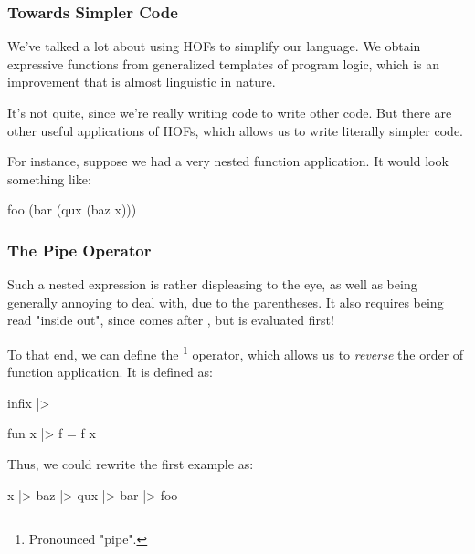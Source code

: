 \documentclass[aspectratio=169]{beamer}
\begin{document}

\begin{frame}[fragile]
  \frametitle{Towards Simpler Code}

  We've talked a lot about using HOFs to simplify our language. We obtain expressive
  functions from generalized templates of program logic, which is an improvement that
  is almost linguistic in nature.

  \pause
  \vspace{\fill}

  It's not quite, since we're really writing code to write other code. But there are
  other useful applications of HOFs, which allows us to write literally simpler code.

  \pause
  \vspace{\fill}

  For instance, suppose we had a very nested function application. It would look
  something like:

  \begin{codeblock}
    foo (bar (qux (baz x)))
  \end{codeblock}
\end{frame}

\begin{frame}[fragile]
  \frametitle{The Pipe Operator}

  Such a nested expression is rather displeasing to the eye, as well as being
  generally annoying to deal with, due to the parentheses. It also requires being
  read "inside out", since  comes after , but is evaluated first!

  \pause
  \vspace{\fill}

  To that end, we can define the \code{|>}\footnote{Pronounced "pipe".} operator, which allows us to
  \textit{reverse} the order of function application. It is defined as:

  \pause
  \begin{codeblock}
    infix |>

    fun x |> f = f x
  \end{codeblock}

  \pause
  \vspace{\fill}

  Thus, we could rewrite the first example as:

  \begin{codeblock}
    x |> baz |> qux |> bar |> foo
  \end{codeblock}
\end{frame}
\end{document}
